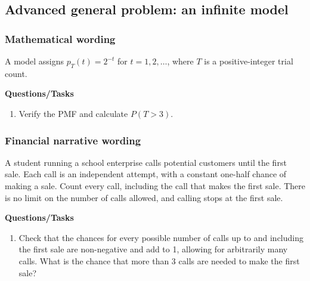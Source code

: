 \subsection{Advanced general problem: an infinite model}
\subsubsection*{Mathematical wording}
A model assigns $p_T(t)=2^{-t}$ for $t=1,2,\ldots$, where $T$ is a positive-integer trial count.

\textbf{Questions/Tasks}
\begin{enumerate}
\item Verify the PMF and calculate $P(T>3)$.
\end{enumerate}
\subsubsection*{Financial narrative wording}
A student running a school enterprise calls potential customers until the first sale. Each call is an independent attempt, with a constant one-half chance of making a sale. Count every call, including the call that makes the first sale. There is no limit on the number of calls allowed, and calling stops at the first sale.

\textbf{Questions/Tasks}
\begin{enumerate}
\item Check that the chances for every possible number of calls up to and including the first sale are non-negative and add to 1, allowing for arbitrarily many calls. What is the chance that more than 3 calls are needed to make the first sale?
\end{enumerate}
